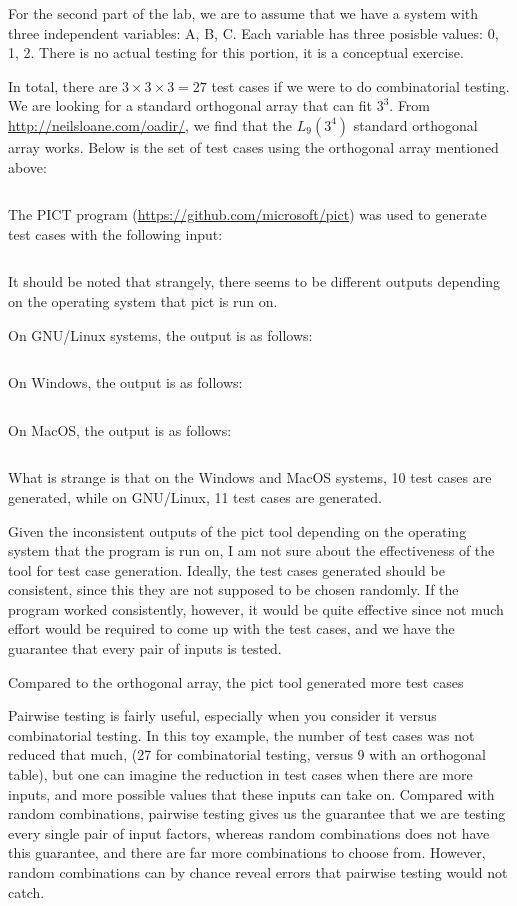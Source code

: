 For the second part of the lab, we are to assume that we have a system with
three independent variables: A, B, C. Each variable has three posisble values:
0, 1, 2. There is no actual testing for this portion, it is a conceptual
exercise.

In total, there are $3 \times 3 \times 3  = 27$ test cases if we were to do
combinatorial testing. We are looking for a standard orthogonal array that
can fit $3^3$. From \url{http://neilsloane.com/oadir/}, we find that
the $L_9(3^4)$ standard orthogonal array works. 
Below is the set of test cases using the orthogonal array mentioned above:

\inputminted{text}{resources/standard3^4}

The PICT program (\url{https://github.com/microsoft/pict}) was used to generate
test cases with the following input:

\inputminted{text}{resources/pict}

It should be noted that strangely, there seems to be different outputs
depending on the operating system that pict is run on.

On GNU/Linux systems, the output is as follows:
\inputminted{text}{resources/pictlinux}

On Windows, the output is as follows:
\inputminted{text}{resources/pictwindoze}

On MacOS, the output is as follows:
\inputminted{text}{resources/pictmacos}

What is strange is that on the Windows and MacOS systems, 10 test cases are
generated, while on GNU/Linux, 11 test cases are generated. 

Given the inconsistent outputs of the pict tool depending on the operating
system that the program is run on, I am not sure about the effectiveness of the
tool for test case generation. Ideally, the test cases generated should be
consistent, since this they are not supposed to be chosen randomly. If the
program worked consistently, however, it would be quite effective since not
much effort would be required to come up with the test cases, and we have the
guarantee that every pair of inputs is tested. 

Compared to the orthogonal array, the pict tool generated more test cases


Pairwise testing is fairly useful, especially when you consider it versus
combinatorial testing. In this toy example, the number of test cases was not
reduced that much, (27 for combinatorial testing, versus 9 with an orthogonal
table), but one can imagine the reduction in test cases when there are more
inputs, and more possible values that these inputs can take on. Compared with
random combinations, pairwise testing gives us the guarantee that we are
testing every single pair of input factors, whereas random combinations
does not have this guarantee, and there are far more combinations to choose
from. However, random combinations can by chance reveal errors that pairwise
testing would not catch.


